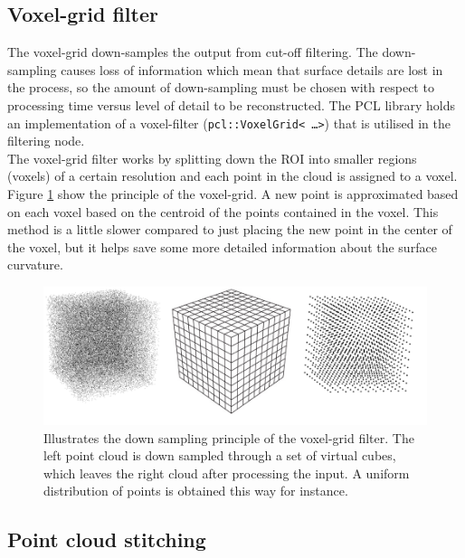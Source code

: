 \subsection{Voxel-grid filter}
The voxel-grid down-samples the output from cut-off filtering. The down-sampling causes loss of information which mean that surface details are lost in the process, so the amount of down-sampling must be chosen with respect to processing time versus level of detail to be reconstructed. The PCL library holds an implementation of a voxel-filter (\texttt{pcl::VoxelGrid< \ldots >}) that is utilised in the filtering node.\\

The voxel-grid filter works by splitting down the ROI into smaller regions (voxels) of a certain resolution and each point in the cloud is assigned to a voxel. Figure \ref{fig:filtering_voxel_grid} show the principle of the voxel-grid. A new point is approximated based on each voxel based on the centroid of the points contained in the voxel. This method is a little slower compared to just placing the new point in the center of the voxel, but it helps save some more detailed information about the surface curvature.
\begin{figure}[htb]
	\begin{center}
		\includegraphics[scale=0.4,trim=0 0 0 0]{graphics/07_modelling/voxelgrid.png}%
		\caption{Illustrates the down sampling principle of the voxel-grid filter. The left point cloud is down sampled through a set of virtual cubes, which leaves the right cloud after processing the input. A uniform distribution of points is obtained this way for instance.}
		\label{fig:filtering_voxel_grid}
	\end{center}
\end{figure}

\subsection{Point cloud stitching}

